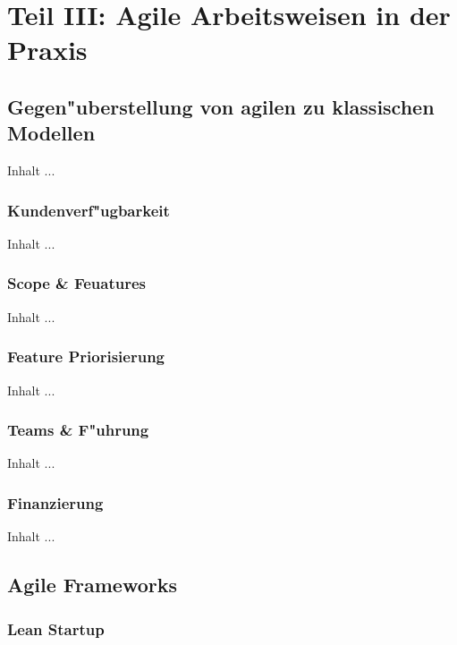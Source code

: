 
\chapter{Teil III: Agile Arbeitsweisen in der Praxis}
\minitoc 
\vspace{1 cm} 

\section{Gegen"uberstellung von agilen zu klassischen Modellen}
Inhalt ...

\subsection{Kundenverf"ugbarkeit}
Inhalt ...


\subsection{Scope \& Feuatures}
Inhalt ...

\subsection{Feature Priorisierung}
Inhalt ...

\subsection{Teams \& F"uhrung}
Inhalt ...

\subsection{Finanzierung}
Inhalt ...


\section{Agile Frameworks}

\subsection{Lean Startup}

